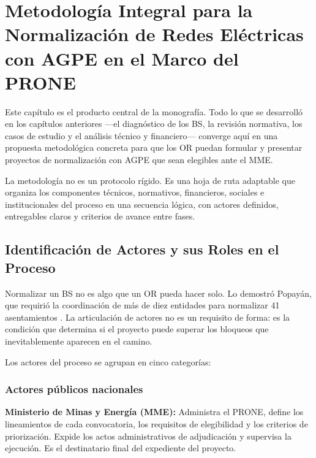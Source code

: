 
\chapter{Metodología Integral para la Normalización de Redes Eléctricas con AGPE en el Marco del PRONE}
\label{chap:metodologia}

Este capítulo es el producto central de la monografía. Todo lo que se
desarrolló en los capítulos anteriores —el diagnóstico de los BS, la
revisión normativa, los casos de estudio y el análisis técnico y
financiero— converge aquí en una propuesta metodológica concreta para
que los OR puedan formular y presentar proyectos de normalización con
AGPE que sean elegibles ante el MME.

La metodología no es un protocolo rígido. Es una hoja de ruta adaptable
que organiza los componentes técnicos, normativos, financieros, sociales
e institucionales del proceso en una secuencia lógica, con actores
definidos, entregables claros y criterios de avance entre fases.


\section{Identificación de Actores y sus Roles en el Proceso}
\label{sec:actores}

Normalizar un BS no es algo que un OR pueda hacer solo. Lo demostró
Popayán, que requirió la coordinación de más de diez entidades para
normalizar 41 asentamientos \parencite{SerranoRueda2019}. La
articulación de actores no es un requisito de forma: es la condición
que determina si el proyecto puede superar los bloqueos que
inevitablemente aparecen en el camino.

Los actores del proceso se agrupan en cinco categorías:

\subsection{Actores públicos nacionales}
\label{subsec:actores_nacionales}

\textbf{Ministerio de Minas y Energía (MME):} Administra el PRONE,
define los lineamientos de cada convocatoria, los requisitos de
elegibilidad y los criterios de priorización. Expide los actos
administrativos de adjudicación y supervisa la ejecución. Es el
destinatario final del expediente del proyecto.


